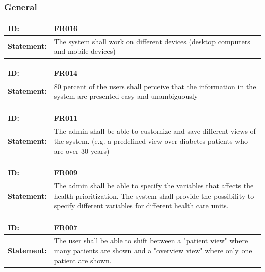\documentclass{scrreprt}
\begin{document}
\subsubsection{General}
\begin{center}
\begin{tabularx}{\linewidth}{| l | X |}
 \hline
 \textbf{ID:} & FR016  \\ 
 \hline
 \textbf{Statement:} & The system shall work on different devices (desktop computers and mobile devices)
  \\ 
 \hline
\end{tabularx}

\begin{tabularx}{\linewidth}{| l | X |}
 \hline
 \textbf{ID:} & FR014  \\ 
 \hline
 \textbf{Statement:} & 80 percent of the users shall perceive that the information in the system are presented easy and unambiguously 
  \\ 
 \hline
\end{tabularx}

\begin{tabularx}{\linewidth}{| l | X |}
 \hline
 \textbf{ID:} & FR011  \\ 
 \hline
 \textbf{Statement:} & The admin shall be able to customize and save different views of the system. (e.g. a predefined view over diabetes patients who are over 30 years)
  \\ 
 \hline
\end{tabularx}

\begin{tabularx}{\linewidth}{| l | X |}
 \hline
 \textbf{ID:} & FR009  \\ 
 \hline
 \textbf{Statement:} & The admin shall be able to specify the variables that affects the health prioritization. The system shall provide the possibility to specify different variables for different health care units. 

 \\ 
 \hline
\end{tabularx}

\begin{tabularx}{\linewidth}{| l | X |}
 \hline
 \textbf{ID:} & FR007  \\ 
 \hline
 \textbf{Statement:} & The user shall be able to shift between a "patient view" where many patients are shown and a "overview view" where only one patient are shown.
 \\ 
 \hline
\end{tabularx}


\end{center}
\end{document}
